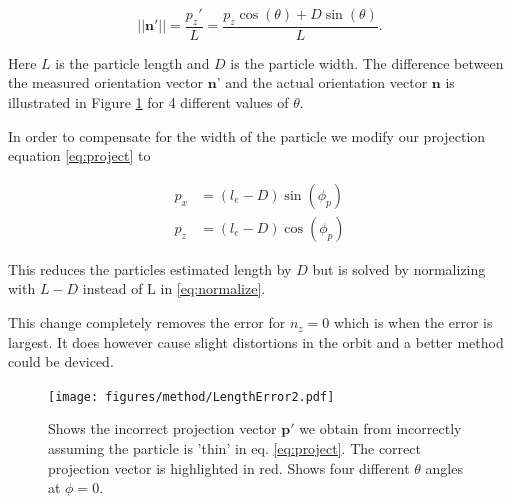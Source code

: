 \begin{equation}\label{eq:widthcomp}
\left| \left|\mathbf{n}'\right|\right| = \frac{p_z'}{L} = \frac{p_z\cos(\theta)  + D\sin(\theta)}{L}. 
\end{equation}

\noindent Here $L$ is the particle length and $D$ is the particle width. The difference between the measured orientation vector $\mathbf{n}$' and the actual orientation vector $\mathbf{n}$ is illustrated in Figure \ref{fig:lengtherror} for 4 different values of $\theta$. 

In order to compensate for the width of the particle we modify our projection equation \ref{eq:project} to

\begin{align}\label{eq:widthCompensation}
p_x  &= (l_e - D) \sin(\phi_p) \\
p_z  &= (l_e - D) \cos(\phi_p) 
\end{align}

This reduces the particles estimated length by $D$ but is solved by normalizing with $L-D$ instead of L in \ref{eq:normalize}.

This change completely removes the error for $n_z = 0$ which is when the error is largest. It does however cause slight distortions in the orbit and a better method could be deviced.

\begin{figure}[H]
\centering
\texttt{[image: figures/method/LengthError2.pdf]}
\caption{Shows the incorrect projection vector $\mathbf{p}'$ we obtain from incorrectly assuming the particle is 'thin' in eq. \ref{eq:project}. The correct projection vector is highlighted in red. Shows four different $\theta$ angles at $\phi=0$.}\label{fig:lengtherror}
\end{figure} 

